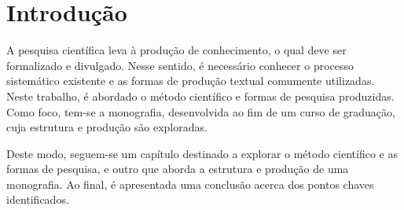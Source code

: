 \section{Introdução}%
\label{sec:introducao}

A pesquisa científica leva à produção de conhecimento, o qual deve ser formalizado e divulgado.
Nesse sentido, é necessário conhecer o processo sistemático existente e as formas de produção textual comumente utilizadas.
Neste trabalho, é abordado o método científico e formas de pesquisa produzidas.
Como foco, tem-se a monografia, desenvolvida ao fim de um curso de graduação, cuja estrutura e produção são exploradas.

Deste modo, seguem-se um capítulo destinado a explorar o método científico e as formas de pesquisa, e outro que aborda a estrutura e produção de uma monografia.
Ao final, é apresentada uma conclusão acerca dos pontos chaves identificados.